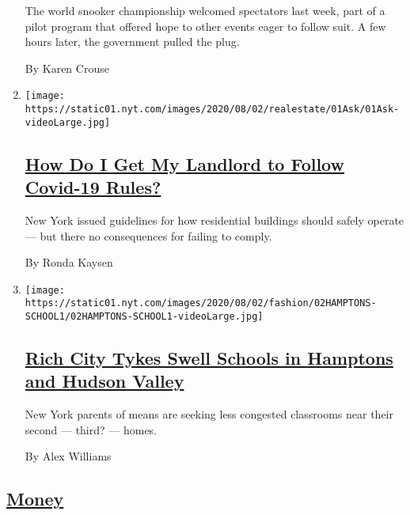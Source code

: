\begin{enumerate}
  The world snooker championship welcomed spectators last week, part of
  a pilot program that offered hope to other events eager to follow
  suit. A few hours later, the government pulled the plug.

  By Karen Crouse
\item
  \texttt{[image: https://static01.nyt.com/images/2020/08/02/realestate/01Ask/01Ask-videoLarge.jpg]}

  \hypertarget{how-do-i-get-my-landlord-to-follow-covid-19-rules}{%
  \subsection{\texorpdfstring{\href{/2020/08/01/realestate/coronavirus-covid-apartment-buildings.html}{How
  Do I Get My Landlord to Follow Covid-19
  Rules?}}{How Do I Get My Landlord to Follow Covid-19 Rules?}}\label{how-do-i-get-my-landlord-to-follow-covid-19-rules}}

  New York issued guidelines for how residential buildings should safely
  operate --- but there no consequences for failing to comply.

  By Ronda Kaysen
\item
  \texttt{[image: https://static01.nyt.com/images/2020/08/02/fashion/02HAMPTONS-SCHOOL1/02HAMPTONS-SCHOOL1-videoLarge.jpg]}

  \hypertarget{rich-city-tykes-swell-schools-in-hamptons-and-hudson-valley}{%
  \subsection{\texorpdfstring{\href{/2020/08/01/style/wealthy-rich-parents-coronavirus-schools-hamptons.html}{Rich
  City Tykes Swell Schools in Hamptons and Hudson
  Valley}}{Rich City Tykes Swell Schools in Hamptons and Hudson Valley}}\label{rich-city-tykes-swell-schools-in-hamptons-and-hudson-valley}}

  New York parents of means are seeking less congested classrooms near
  their second --- third? --- homes.

  By Alex Williams
\end{enumerate}

\hypertarget{money}{%
\subsection{\texorpdfstring{\protect\hyperlink{}{Money}}{Money}}\label{money}}

